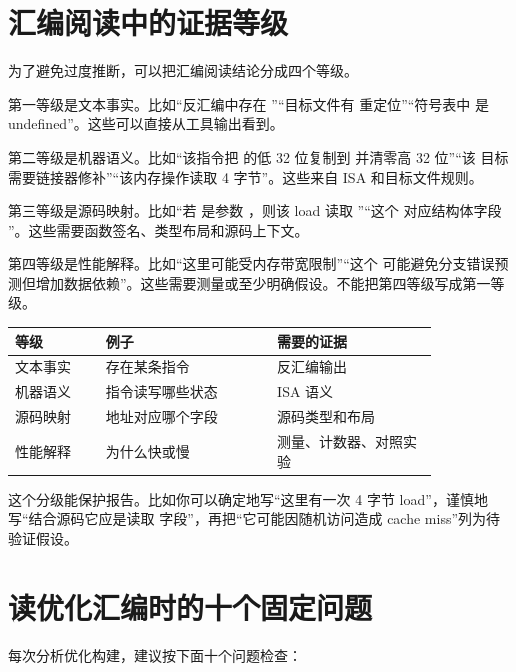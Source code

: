\section{汇编阅读中的证据等级}

为了避免过度推断，可以把汇编阅读结论分成四个等级。

第一等级是文本事实。比如“反汇编中存在 ”“目标文件有  重定位”“符号表中  是 undefined”。这些可以直接从工具输出看到。

第二等级是机器语义。比如“该指令把  的低 32 位复制到  并清零高 32 位”“该  目标需要链接器修补”“该内存操作读取 4 字节”。这些来自 ISA 和目标文件规则。

第三等级是源码映射。比如“若  是参数 ，则该 load 读取 ”“这个  对应结构体字段 ”。这些需要函数签名、类型布局和源码上下文。

第四等级是性能解释。比如“这里可能受内存带宽限制”“这个  可能避免分支错误预测但增加数据依赖”。这些需要测量或至少明确假设。不能把第四等级写成第一等级。

\begin{center}
\begin{tabular}{p{0.18\linewidth}p{0.34\linewidth}p{0.32\linewidth}}
\toprule
等级 & 例子 & 需要的证据 \\
\midrule
文本事实 & 存在某条指令 & 反汇编输出 \\
机器语义 & 指令读写哪些状态 & ISA 语义 \\
源码映射 & 地址对应哪个字段 & 源码类型和布局 \\
性能解释 & 为什么快或慢 & 测量、计数器、对照实验 \\
\bottomrule
\end{tabular}
\end{center}

这个分级能保护报告。比如你可以确定地写“这里有一次 4 字节 load”，谨慎地写“结合源码它应是读取  字段”，再把“它可能因随机访问造成 cache miss”列为待验证假设。

\section{读优化汇编时的十个固定问题}

每次分析优化构建，建议按下面十个问题检查：

